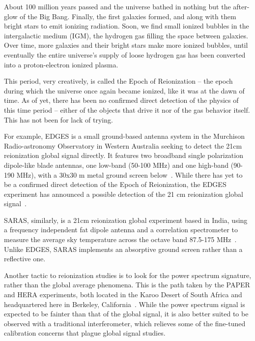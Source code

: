 About 100 million years passed and the universe bathed in nothing but the 
after-glow of the Big Bang. Finally, the first galaxies formed, and along with 
them bright stars to emit ionizing radiation. Soon, we find small ionized 
bubbles in the intergalactic medium (IGM), the hydrogen gas filling the space 
between galaxies. Over time, more galaxies and their bright stars make more 
ionized bubbles, until eventually the entire universe's supply of loose 
hydrogen gas has been converted into a proton-electron ionized plasma.

This period, very creatively, is called the Epoch of Reionization -- the epoch 
during which the universe once again became ionized, like it was at the dawn of 
time. As of yet, there has been no confirmed direct detection of the physics of 
this time period -- either of the objects that drive it nor of the gas behavior 
itself.  This has not been for lack of trying. 

For example, EDGES is a small ground-based antenna system in the Murchison 
Radio-astronomy Observatory in Western Australia seeking to detect the 21cm 
reionization global signal directly.  It features two broadband single 
polarization dipole-like blade antennas, one low-band (50-100 MHz) and one 
high-band (90-190 MHz), with a 30x30 m metal ground screen 
below~\citep{monsalve2017}. While there has yet to be a confirmed direct 
detection of the Epoch of Reionization, the EDGES experiment has announced a 
possible detection of the 21 cm reionization global signal~\citep{bowman2018}.

SARAS, similarly, is a 21cm reionization global experiment based in India, 
using a frequency independent fat dipole antenna and a correlation spectrometer 
to measure the average sky temperature across the octave band 87.5-175 
MHz~\citep{patra2013}.  Unlike EDGES, SARAS implements an absorptive ground 
screen rather than a reflective one.

Another tactic to reionization studies is to look for the power spectrum 
signature, rather than the global average phenomena. This is the path taken by 
the PAPER and HERA experiments, both located in the Karoo Desert of South 
Africa and headquartered here in Berkeley, California~\citep{deboer2017}. While 
the power spectrum signal is expected to be fainter than that of the global 
signal, it is also better suited to be observed with a traditional 
interferometer, which relieves some of the fine-tuned calibration concerns that 
plague global signal studies. 

